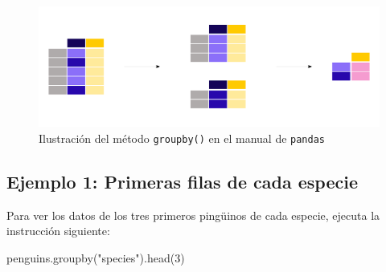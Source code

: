 \documentclass[
  a4paper,
  noprof,
  12pt,
  notoc,
  nosols,
  nobib]{mnye}
\newenvironment{Shaded}{\begin{snugshade}}{\end{snugshade}}
\newcommand{\DecValTok}[1]{\textcolor[rgb]{0.68,0.00,0.00}{#1}}
\newcommand{\NormalTok}[1]{\textcolor[rgb]{0.00,0.23,0.31}{#1}}
\newcommand{\StringTok}[1]{\textcolor[rgb]{0.13,0.47,0.30}{#1}}
\theoremstyle{definition}
\theoremstyle{remark}
\begin{document}
\begin{figure}[tbph]

{\centering \includegraphics{index_files/mediabag/chapters/../img/06_groupby.pdf}

}

\caption{Ilustración del método \texttt{groupby()} en el manual de
\texttt{pandas}}

\end{figure}

\hypertarget{ejemplo-1-primeras-filas-de-cada-especie}{%
\subsection*{Ejemplo 1: Primeras filas de cada
especie}\label{ejemplo-1-primeras-filas-de-cada-especie}}


Para ver los datos de los tres primeros pingüinos de cada especie,
ejecuta la instrucción siguiente:

\begin{Shaded}
\begin{Highlighting}[]
\NormalTok{penguins.groupby(}\StringTok{"species"}\NormalTok{).head(}\DecValTok{3}\NormalTok{)}
\end{Highlighting}
\end{Shaded}
\end{document}
